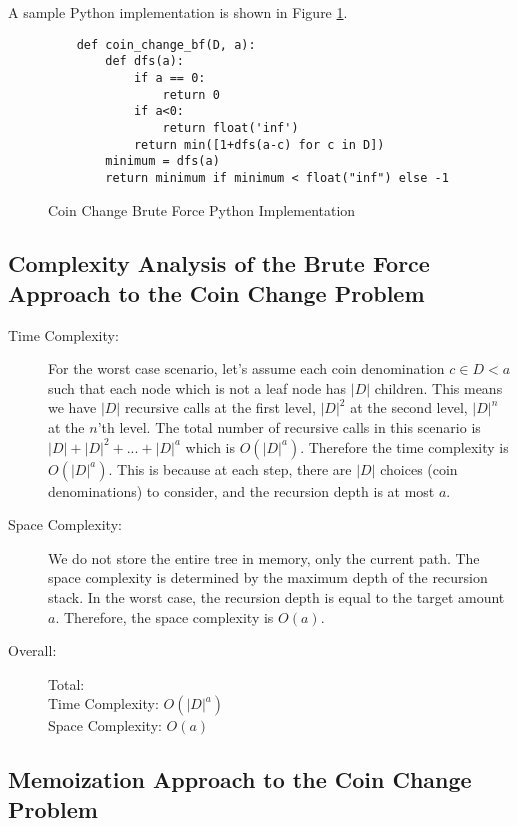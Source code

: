 A sample Python implementation is shown in Figure \ref{fig:coin-change-bf}.

\begin{figure}[h]
    \centering
    \begin{lstlisting}
    def coin_change_bf(D, a):
        def dfs(a):
            if a == 0:
                return 0
            if a<0:
                return float('inf')
            return min([1+dfs(a-c) for c in D])
        minimum = dfs(a)
        return minimum if minimum < float("inf") else -1
    \end{lstlisting}
    \caption{Coin Change Brute Force Python Implementation}
    \label{fig:coin-change-bf}
\end{figure}

\subsection{Complexity Analysis of the Brute Force Approach to the Coin Change Problem}

\begin{description}
    \item[Time Complexity:]
    For the worst case scenario, let's assume each coin denomination $c \in D < a$ such that each node which is not a leaf node has $|D|$ children. This means we have $|D|$ recursive calls at the first level, $|D|^{2}$ at the second level, $|D|^{n}$ at the $n$'th level.
    The total number of recursive calls in this scenario is $|D| + |D|^{2} + ... + |D|^{a}$ which is $O(|D|^a)$.
    Therefore the time complexity is $O(|D|^{a})$. This is because at each step, there are $|D|$ choices (coin denominations) to consider, and the recursion depth is at most $a$.
    
        
    \item[Space Complexity:] 
        We do not store the entire tree in memory, only the current path.
        The space complexity is determined by the maximum depth of the recursion stack. In the worst case, the recursion depth is equal to the target amount $a$. Therefore, the space complexity is $O(a)$.
        
        
    \item[Overall:] Total:\\
        Time Complexity: $O(|D|^a)$\\
        Space Complexity: $O(a)$
        
\end{description}

\subsection{Memoization Approach to the Coin Change Problem}

